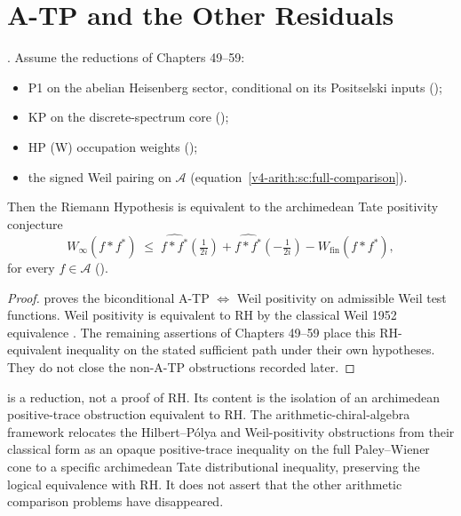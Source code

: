 \section{A-TP and the Other Residuals}
\label{v4-arith:w5-synth:single-residual}

\begin{theorem}
\label{v4-arith:w5-synth:thm:RH-equiv-ATP}
\ClaimStatusProvedHereConditional. Assume the reductions of Chapters 49--59:
\begin{itemize}
\item P1 on the abelian Heisenberg sector, conditional on its
Positselski inputs
();
\item KP on the discrete-spectrum core
();
\item HP (W) occupation weights
();
\item the signed Weil pairing on $\mathscr A$
(equation~\eqref{v4-arith:sc:full-comparison}).
\end{itemize}
Then the Riemann Hypothesis is equivalent to the archimedean Tate
positivity conjecture
\begin{equation}
\label{v4-arith:w5-synth:eq:ATP}
W_{\infty}(f*f^*)\;\leq\;
\widehat{f*f^*}(\tfrac{1}{2i})+
\widehat{f*f^*}(-\tfrac{1}{2i})-
W_{\mathrm{fin}}(f*f^*),
\end{equation}
for every \(f\in\mathscr A\)
().
\end{theorem}

\begin{proof}
 proves the
biconditional A-TP \(\Leftrightarrow\) Weil positivity on admissible
Weil test functions. Weil positivity is equivalent to RH by the
classical Weil 1952 equivalence
. The remaining assertions
of Chapters 49--59 place this RH-equivalent inequality on the stated
sufficient path under their own hypotheses. They do not close the
non-A-TP obstructions recorded later.
\end{proof}

\begin{remark}[Reduction to A-TP]
\label{v4-arith:w5-synth:rem:honest-reduction}
 is a reduction, not a
proof of RH. Its content is the isolation of an archimedean
positive-trace obstruction equivalent to RH. The
arithmetic-chiral-algebra framework relocates the Hilbert--P\'{o}lya
and Weil-positivity obstructions from their classical form as an
opaque positive-trace inequality on the full Paley--Wiener cone to a
specific archimedean Tate distributional inequality, preserving the
logical equivalence with RH.  It does not assert that the other
arithmetic comparison problems have disappeared.
\end{remark}

